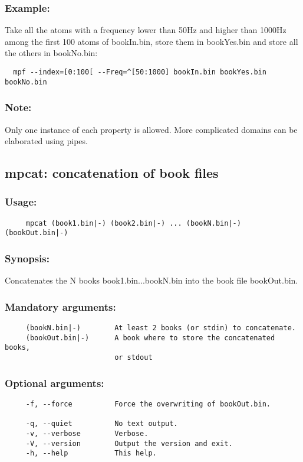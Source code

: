 \documentclass[11pt,a4paper]{article}
\begin{document}
\subsubsection*{Example:}
Take all the atoms with a frequency lower than 50Hz and higher than 1000Hz
among the first 100 atoms of bookIn.bin, store them in bookYes.bin and store
all the others in bookNo.bin:
\begin{verbatim}
  mpf --index=[0:100[ --Freq=^[50:1000] bookIn.bin bookYes.bin bookNo.bin
\end{verbatim}

\subsubsection*{Note:}
Only one instance of each property is allowed. More complicated domains can be
elaborated using pipes.


\clearpage
\subsection{mpcat: concatenation of book files}

\subsubsection*{Usage:}
\begin{verbatim}
     mpcat (book1.bin|-) (book2.bin|-) ... (bookN.bin|-) (bookOut.bin|-)
\end{verbatim}

\subsubsection*{Synopsis:}
Concatenates the N books book1.bin...bookN.bin into the book file bookOut.bin.

\subsubsection*{Mandatory arguments:}
\begin{verbatim}
     (bookN.bin|-)        At least 2 books (or stdin) to concatenate.
     (bookOut.bin|-)      A book where to store the concatenated books,
                          or stdout
\end{verbatim}

\subsubsection*{Optional arguments:}
\begin{verbatim}
     -f, --force          Force the overwriting of bookOut.bin.

     -q, --quiet          No text output.
     -v, --verbose        Verbose.
     -V, --version        Output the version and exit.
     -h, --help           This help.
\end{verbatim}
\end{document}
